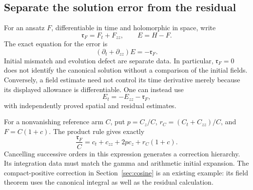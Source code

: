 \documentclass[11pt]{article}
\numberwithin{equation}{section}
\begin{document}
\subsection{Separate the solution error from the residual}
For an ansatz \(F\), differentiable in time and holomorphic in space,
write
\begin{equation}
 \mathfrak r_F=F_t+F_{zz},\qquad E=H-F.
 \label{eq:ansatz-defect}
\end{equation}
The exact equation for the error is
\begin{equation}
 (\partial_t+\partial_{zz})E=-\mathfrak r_F.
 \label{eq:forced-error}
\end{equation}
Initial mismatch and evolution defect are separate data. In
particular, \(\mathfrak r_F=0\) does not identify the canonical
solution without a comparison of the initial fields. Conversely,
a field estimate need not control its time derivative merely because
its displayed allowance is differentiable. One can instead use
\begin{equation}
 E_t=-E_{zz}-\mathfrak r_F,
 \label{eq:direct-time-error}
\end{equation}
with independently proved spatial and residual estimates.

For a nonvanishing reference arm \(C\), put
\(p=C_z/C\), \(r_C=(C_t+C_{zz})/C\), and \(F=C(1+c)\).
The product rule gives exactly
\begin{equation}
 \frac{\mathfrak r_F}{C}
 =c_t+c_{zz}+2p c_z+r_C(1+c).
 \label{eq:correction-hierarchy}
\end{equation}
Cancelling successive orders in this expression generates a correction
hierarchy. Its integration data must match the gamma and arithmetic
initial expansion. The compact-positive correction in
Section~\ref{sec:cosine} is an existing example: its field theorem
uses the canonical integral as well as the residual calculation.
\end{document}
